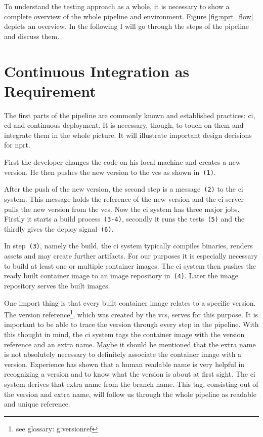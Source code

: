 To understand the testing approach as a whole, it is necessary to show a complete overview
of the whole pipeline and environment. Figure \ref{fig:nprt_flow} depicts an overview. In
the following I will go through the steps of the pipeline and discuss them.

\section{Continuous Integration as Requirement}

The first parts of the pipeline are commonly known and established practices: \gls{ci},
\gls{cd} and continuous deployment. It is necessary, though, to touch on them and
integrate them in the whole picture. It will illustrate important design decisions for
\gls{nprt}.

First the developer changes the code on his local machine and creates a new version. He
then pushes the new version to the \gls{vcs} as shown in~\texttt{(1)}.

After the push of the new version, the second step is a message~\texttt{(2)} to the
\gls{ci} system. This message holds the reference of the new version and the \gls{ci}
server pulls the new version from the \gls{vcs}. Now the \gls{ci} system has three major
jobs. Firstly it starts a build process~\texttt{(3-4)}, secondly it runs the
tests~\texttt{(5)} and the thirdly gives the deploy signal~\texttt{(6)}.

In step~\texttt{(3)}, namely the build, the \gls{ci} system typically compiles binaries,
renders assets and may create further artifacts. For our purposes it is especially
necessary to build at least one or multiple container images. The \gls{ci} system then
pushes the ready built container image to an image repository in~\texttt{(4)}. Later the
image repository serves the built images.

One import thing is that every built container image relates to a specific version. The
version reference\footnote{see glossary: \gls{g:versionref}}, which was created by the
\gls{vcs}, serves for this purpose. It is important to be able to trace the version
through every step in the pipeline. With this thought in mind, the \gls{ci} system tags
the container image with the version reference and an extra name. Maybe it should be
mentioned that the extra name is not absolutely necessary to definitely associate the
container image with a version. Experience has shown that a human readable name is very
helpful in recognizing a version and to know what the version is about at first sight. The
\gls{ci} system derives that extra name from the branch name. This tag, consisting out of
the version and extra name, will follow us through the whole pipeline as readable and
unique reference.

